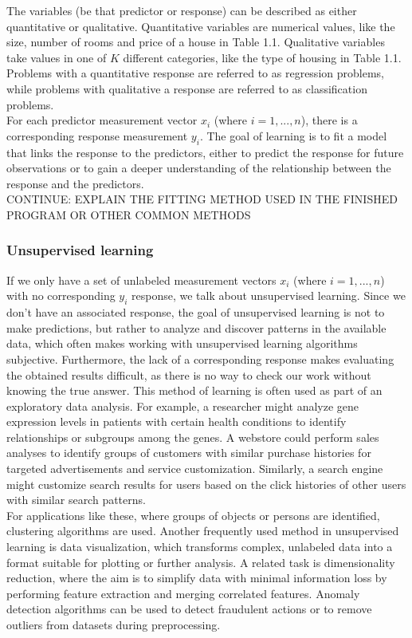 \documentclass[a4paper,oneside,onecolumn,12pt]{LegrandOrangeBook}
\begin{document}
			The variables (be that predictor or response) can be described as either quantitative or qualitative. Quantitative variables are numerical values, like the size, number of rooms and price of a house in Table 1.1. Qualitative variables take values in one of $K$ different categories, like the type of housing in Table 1.1. Problems with a quantitative response are referred to as regression problems, while problems with qualitative a response are referred to as classification problems. \cite{AISL}\\
			For each predictor measurement vector $x_i$ (where $i = 1, ..., n$), there is a corresponding response measurement $y_i$. The goal of learning is to fit a model that links the response to the predictors, either to predict the response for future observations or to gain a deeper understanding of the relationship between the response and the predictors. \cite{AISL}\\
			CONTINUE: EXPLAIN THE FITTING METHOD USED IN THE FINISHED PROGRAM OR OTHER COMMON METHODS\\

			\subsubsection{Unsupervised learning}
			If we only have a set of unlabeled measurement vectors $x_i$ (where $i = 1, ..., n$) with no corresponding $y_i$ response, we talk about unsupervised learning. Since we don't have an associated response, the goal of unsupervised learning is not to make predictions, but rather to analyze and discover patterns in the available data, which often makes working with unsupervised learning algorithms subjective. Furthermore, the lack of a corresponding response makes evaluating the obtained results difficult, as there is no way to check our work without knowing the true answer. This method of learning is often used as part of an exploratory data analysis. For example, a researcher might analyze gene expression levels in patients with certain health conditions to identify relationships or subgroups among the genes. A webstore could perform sales analyses to identify groups of customers with similar purchase histories for targeted advertisements and service customization. Similarly, a search engine might customize search results for users based on the click histories of other users with similar search patterns. \cite{AISL} \\
			For applications like these, where groups of objects or persons are identified, clustering algorithms are used. Another frequently used method in unsupervised learning is data visualization, which transforms complex, unlabeled data into a format suitable for plotting or further analysis. A related task is dimensionality reduction, where the aim is to simplify data with minimal information loss by performing feature extraction and merging correlated features. Anomaly detection algorithms can be used to detect fraudulent actions or to remove outliers from datasets during preprocessing. \cite{HMLSKT}
\end{document}
